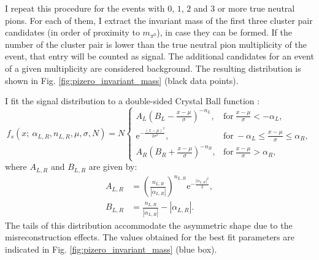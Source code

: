I repeat this procedure for the events with $0$, $1$, $2$ and $3$ or more true neutral pions. For each of them, I extract the invariant mass of the first three cluster pair candidates (in order of proximity to $m_{\pi^{0}}$), in case they can be formed. If the number of the cluster pair is lower than the true neutral pion multiplicity of the event, that entry will be counted as signal. The additional candidates for an event of a given multiplicity are considered background. The resulting distribution is shown in Fig. \ref{fig:pizero_invariant_mass} (black data points).

I fit the signal distribution to a double-sided Crystal Ball function \cite{Gaiser1982}:
\begin{equation}
    f_{s} (x; ~\alpha_{L,R}, n_{L,R}, \mu, \sigma, N) = N \left\{
    \begin{array}{ll}
        A_{L} \left(B_{L} - \frac{x - \mu}{\sigma}\right)^{-n_{L}}, & \mathrm{for} \ \frac{x - \mu}{\sigma} < -\alpha_{L},\\
        \mathrm{e}^{-\frac{(x-\mu)^{2}}{2 \sigma^{2}}}, & \mathrm{for} \ -\alpha_{L} \leq \frac{x - \mu}{\sigma} \leq \alpha_{R},\\
        A_{R} \left(B_{R} + \frac{x - \mu}{\sigma}\right)^{-n_{R}}, & \mathrm{for} \ \frac{x - \mu}{\sigma} > \alpha_{R},
    \end{array}
    \right.
\end{equation}
where $A_{L,R}$ and $B_{L,R}$ are given by:
\begin{equation}
\begin{split}
    A_{L,R} &= \left(\frac{n_{L,R}}{|\alpha_{L,R}|}\right)^{n_{L,R}} \mathrm{e}^{-\frac{|\alpha_{L,R}|^{2}}{2}},\\
    B_{L,R} &= \frac{n_{L,R}}{|\alpha_{L,R}|}-|\alpha_{L,R}|.
\end{split}
\end{equation}
The tails of this distribution accommodate the asymmetric shape due to the misreconstruction effects. The values obtained for the best fit parameters are indicated in Fig. \ref{fig:pizero_invariant_mass} (blue box).

